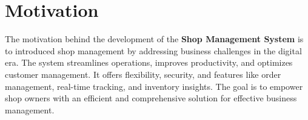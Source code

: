 \section{Motivation}
The motivation behind the development of the \textbf{Shop Management System} is to introduced shop management by addressing business challenges in the digital era. The system streamlines operations, improves productivity, and optimizes customer management. It offers flexibility, security, and features like order management, real-time tracking, and inventory insights. The goal is to empower shop owners with an efficient and comprehensive solution for effective business management.
